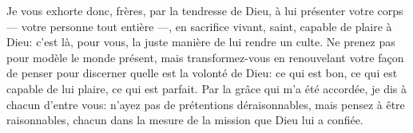 Je vous exhorte donc, frères, par la tendresse de Dieu,
	à lui présenter votre corps --- votre personne tout entière ---,
	en sacrifice vivant, saint, capable de plaire à Dieu:
	c’est là, pour vous, la juste manière de lui rendre un culte.
Ne prenez pas pour modèle le monde présent,
	mais transformez-vous en renouvelant votre façon de penser
	pour discerner quelle est la volonté de Dieu:
	ce qui est bon, ce qui est capable de lui plaire, ce qui est parfait.
Par la grâce qui m’a été accordée, je dis à chacun d’entre vous:
	n’ayez pas de prétentions déraisonnables, mais pensez à être raisonnables,
	chacun dans la mesure de la mission que Dieu lui a confiée.
